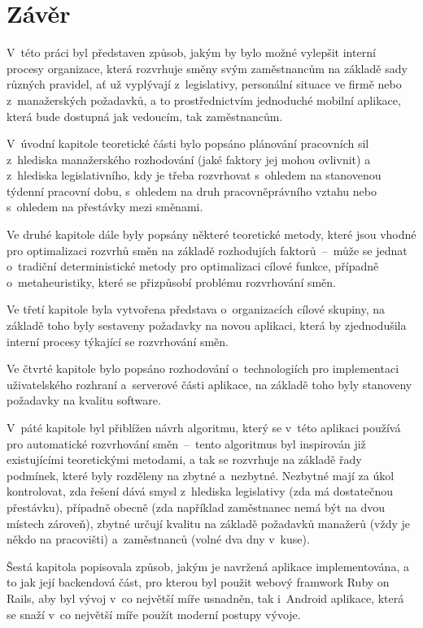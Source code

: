 \documentclass[twoside]{ctuthesis}
\begin{document}
\chapter*{Závěr}

V~této práci byl představen způsob, jakým by bylo možné vylepšit interní procesy organizace, která rozvrhuje směny svým zaměstnancům na základě sady různých pravidel, ať už vyplývají z~legislativy, personální situace ve firmě nebo z~manažerských požadavků, a to prostřednictvím jednoduché mobilní aplikace, která bude dostupná jak vedoucím, tak zaměstnancům.

V~úvodní kapitole teoretické části bylo popsáno plánování pracovních sil z~hlediska manažerského rozhodování (jaké faktory jej mohou ovlivnit) a z~hlediska legislativního, kdy je třeba rozvrhovat s~ohledem na stanovenou týdenní pracovní dobu, s~ohledem na druh pracovněprávního vztahu nebo s~ohledem na přestávky mezi směnami.

Ve druhé kapitole dále byly popsány některé teoretické metody, které jsou vhodné pro optimalizaci rozvrhů směn na základě rozhodujích faktorů~–~může se jednat o~tradiční deterministické metody pro optimalizaci cílové funkce, případně o~metaheuristiky, které se přizpůsobí problému rozvrhování směn.

Ve třetí kapitole byla vytvořena představa o~organizacích cílové skupiny, na základě toho byly sestaveny požadavky na novou aplikaci, která by zjednodušila interní procesy týkající se rozvrhování směn.

Ve čtvrté kapitole bylo popsáno rozhodování o~technologiích pro implementaci uživatelského rozhraní a~serverové části aplikace, na základě toho byly stanoveny požadavky na kvalitu software.

V~páté kapitole byl přiblížen návrh algoritmu, který se v~této aplikaci používá pro automatické rozvrhování směn~–~tento algoritmus byl inspirován již existujícími teoretickými metodami, a tak se rozvrhuje na základě řady podmínek, které byly rozděleny na zbytné a~nezbytné. Nezbytné mají za úkol kontrolovat, zda řešení dává smysl z~hlediska legislativy (zda má dostatečnou přestávku), případně obecně (zda například zaměstnanec nemá být na dvou místech zároveň), zbytné určují kvalitu na základě požadavků manažerů (vždy je někdo na pracovišti) a~zaměstnanců (volné dva dny v~kuse).

Šestá kapitola popisovala způsob, jakým je navržená aplikace implementována, a to jak její backendová část, pro kterou byl použit webový framwork Ruby on Rails, aby byl vývoj v~co největší míře usnadněn, tak i~Android aplikace, která se snaží v~co největší míře použít moderní postupy vývoje.
\end{document}
